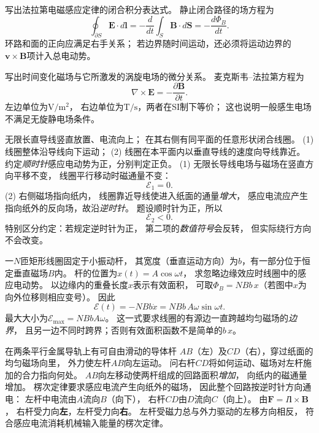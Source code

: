\problemtext 写出法拉第电磁感应定律的闭合积分表达式。
\workings
静止闭合路径的场方程为
\[
\boxed{\oint_{\partial S}\bm E\cdot d\bm l
=-\frac d{dt}\int_S\bm B\cdot d\bm S
=-\frac{d\Phi_B}{dt}}.
\]
\crosscheck 环路和面的正向应满足右手关系；
若边界随时间运动，还必须将运动边界的
$\bm v\times\bm B$项计入总电动势。

\problemtext 写出时间变化磁场与它所激发的涡旋电场的微分关系。
\workings
麦克斯韦--法拉第方程为
\[
\boxed{\nabla\times\bm E=-\frac{\partial\bm B}{\partial t}}.
\]
\crosscheck 左边单位为$\mathrm{V/m^2}$，
右边单位为$\mathrm{T/s}$，两者在SI制下等价；
这也说明一般感生电场不满足无旋静电场条件。

\problemtext 无限长直导线竖直放置、电流向上；
在其右侧有同平面的任意形状闭合线圈。
(1) 线圈整体沿导线向下运动；
(2) 线圈在本平面内以垂直导线的速度向导线靠近。
约定\emph{顺时针}感应电动势为正，分别判定正负。
\workings
(1) 无限长导线电场与磁场在竖直方向平移不变，
线圈平行移动时磁通量不变：
\[
\boxed{\mathcal E_1=0}.
\]
(2) 右侧磁场指向纸内，
线圈靠近导线使进入纸面的通量\emph{增大}，
感应电流应产生指向纸外的反向场，故沿\emph{逆时针}。
题设顺时针为正，所以
\[
\boxed{\mathcal E_2<0}.
\]
\crosscheck 特别区分约定：若规定逆时针为正，
第二项的\emph{数值符号}会反转，
但实际绕行方向不会改变。

\problemtext 一$N$匝矩形线圈固定于小振动杆，
其宽度（垂直运动方向）为$b$，有一部分位于恒定垂直磁场$B$内。
杆的位置为$x(t)=A\cos\omega t$，
求忽略边缘效应时线圈中的感应电动势。
\workings
以边缘内的重叠长度$x$表示有效面积，
可取$\Phi_B=NBb\,x$（若图中$x$为向外位移则相应变号）。
因此
\[
\boxed{\mathcal E(t)=-NBb\dot x
=NBb\,A\omega\sin\omega t}.
\]
最大大小为$\boxed{\mathcal E_{\max}=NBbA\omega}$。
\crosscheck 这一式要求线圈的有源边一直跨越均匀磁场的\emph{边界}，
且另一边不同时跨界；否则有效面积函数不是简单的$b\,x$。

\problemtext 在两条平行金属导轨上有可自由滑动的导体杆
$AB$（左）及$CD$（右），穿过纸面的均匀磁场向里，
外力使左杆$AB$向左运动。
问右杆$CD$将如何运动、磁场对左杆施加的合力指向何处。
\workings
$AB$向左移动使两杆组成的回路面积\emph{增加}，
向纸内的磁通量增加。
楞次定律要求感应电流产生向纸外的磁场，
因此整个回路按逆时针方向通电：
左杆中电流由$A$流向$B$（向下），
右杆$CD$由$D$流向$C$（向上）。
由$\bm F=I\bm l\times\bm B$，
右杆受力向\textbf{左}，左杆受力向\textbf{右}。
\crosscheck 左杆受磁力总与外力驱动的左移方向相反，
符合感应电流消耗机械输入能量的楞次定律。

